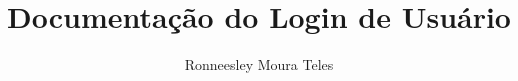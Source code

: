 \documentclass[versao=digital]{tc_ifgoiano_ceres}
\author{Ronneesley Moura Teles}
\title{Documentação do Login de Usuário}
\begin{document}
	
	
	\textual

	
	
	\postextual	
	

\end{document}
